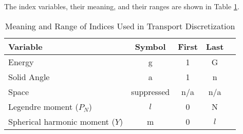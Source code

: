 \documentclass[12pt]{article}
\begin{document}
The index variables, their meaning, and their ranges are shown in Table \ref{table:index}. 
%
\begin{table}[!h]
\caption{Meaning and Range of Indices Used in Transport Discretization}
\begin{center}
\begin{tabular}{l c c c c}
\hline
Variable & Symbol & First & Last \\[0.5ex]
\hline
Energy & g & 1 & G \\
Solid Angle & a & 1 & n \\
Space & suppressed & n/a & n/a \\
Legendre moment ($P_{N}$) & $l$ & 0 & N \\
Spherical harmonic moment ($Y$) & m & 0 & $l$ \\
\hline
\end{tabular}
\end{center}
\label{table:index}
\end{table}
%
\end{document}

